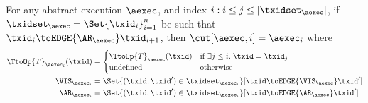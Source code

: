 \begin{lemma}[Prefix]
\label{lem:cut.explicit}
For any abstract execution $\aexec$, and index $i: i \leq j \leq \lvert \txidset_{\aexec} \rvert$, 
if $\txidset_{\aexec} = \Set{\txid_{i}}_{i=1}^{n}$ be such that 
$\txid_{i} \toEDGE{\AR_{\aexec}} \txid_{i+1}$, 
then $\cut[\aexec, i] = \aexec_{i}$ where 
\begin{align*}
\TtoOp{T}_{\aexec_{i}}(\txid) &=
\begin{cases}
\TtoOp{T}_{\aexec}(\txid) & \text{if } \exists j \leq i.\; \txid = \txid_{j}\\
\text{undefined} & \text{otherwise}\\
\end{cases} \\
\VIS_{\aexec_{i}} &= \Set{ (\txid, \txid') \in \txidset_{\aexec_{i}} }[ \txid \toEDGE{\VIS_{\aexec}} \txid'] \\
\AR_{\aexec_{i}} &= \Set{ (\txid, \txid') \in \txidset_{\aexec_{i}} }[ \txid \toEDGE{\AR_{\aexec}} \txid']
\end{align*}
\end{lemma}

